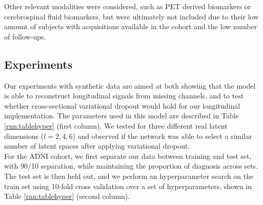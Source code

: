 Other relevant modalities were considered, such as PET derived biomarkers or cerebrospinal fluid biomarkers, but were ultimately not included due to their low amount of subjects with acquisitions available in the cohort and the low number of follow-ups. \\ 

\subsection{Experiments}

Our experiments with synthetic data are aimed at both showing that the model is able to reconstruct longitudinal signals from missing channels, and to test whether cross-sectional variational dropout would hold for our longitudinal implementation. The parameters used in this model are described in Table \ref{rnn:tablehyper} (first column). We tested for three different real latent dimensions ($l = {2,4,6}$) and observed if the network was able to select a similar number of latent spaces after applying variational dropout. \\

For the ADNI cohort, we first separate our data between training and test set, with 90/10 separation, while maintaining the proportion of diagnosis across sets. The test set is then held out, and we perform an hyperparameter search on the train set using 10-fold cross validation over a set of hyperparameters, shown in Table \ref{rnn:tablehyper} (second column). \\

\begin{table}[!htbp]
\centering
{}
\caption[Hyperparameters of the model.]{Table of hyperparameters. Left column: parameters used with the synthetic model. Right column: parameters used for ADNI model optimization. Layer size: size of all layers in the network (encoder, decoder and $\phi$). RNN hidden: size of the hidden layer in the RNN.}\label{rnn:tablehyper}
\end{table}

